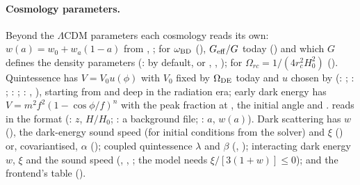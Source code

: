 \paragraph*{Cosmology parameters.} Beyond the $\Lambda$CDM parameters each cosmology reads its own:
$w(a)=w_0+w_a(1-a)$ from , ; for  $\omega_{\rm BD}$
(), $G_{\rm eff}/G$ today () and which $G$ defines the density
parameters (:  by default, or ,
, ); for  $\Omega_{rc}=1/(4r_c^2H_0^2)$ (). Quintessence has
$V=V_0u(\phi)$ with $V_0$ fixed by $\Omega_{\rm DE}$ today and $u$ chosen by 
(: ; : ;
: ; : ,
), starting from  and
 deep in the radiation era; early dark energy has
$V=m^2f^2(1-\cos\phi/f)^n$ with the peak fraction  at , the initial
angle  and .  reads 
in the format  (: $z$, $H/H_0$; : a background file; : $a$,
$w(a)$). Dark scattering has $w$ (), the dark-energy sound speed  (for initial
conditions from the solver) and $\xi$ () or, covariantised, $\alpha$ ();
coupled quintessence $\lambda$ and $\beta$ (, ); interacting dark
energy $w$, $\xi$ and the sound speed (, , ; the
model needs $\xi/[3(1+w)]\le0$); and  the frontend's table ().

